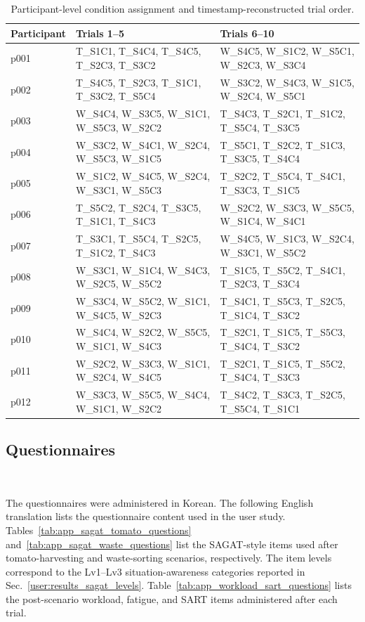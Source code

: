 \begin{table}[t]
\centering
\caption{Participant-level condition assignment and timestamp-reconstructed trial order.}
\label{tab:app_participant_condition_order}
\scriptsize
\setlength{\tabcolsep}{3pt}
\begin{tabular*}{\textwidth}{@{\extracolsep{\fill}}lll}
\toprule
\textbf{Participant} & \textbf{Trials 1--5} & \textbf{Trials 6--10} \\
\midrule
p001 & T\_S1C1, T\_S4C4, T\_S4C5, T\_S2C3, T\_S3C2 & W\_S4C5, W\_S1C2, W\_S5C1, W\_S2C3, W\_S3C4 \\
p002 & T\_S4C5, T\_S2C3, T\_S1C1, T\_S3C2, T\_S5C4 & W\_S3C2, W\_S4C3, W\_S1C5, W\_S2C4, W\_S5C1 \\
p003 & W\_S4C4, W\_S3C5, W\_S1C1, W\_S5C3, W\_S2C2 & T\_S4C3, T\_S2C1, T\_S1C2, T\_S5C4, T\_S3C5 \\
p004 & W\_S3C2, W\_S4C1, W\_S2C4, W\_S5C3, W\_S1C5 & T\_S5C1, T\_S2C2, T\_S1C3, T\_S3C5, T\_S4C4 \\
p005 & W\_S1C2, W\_S4C5, W\_S2C4, W\_S3C1, W\_S5C3 & T\_S2C2, T\_S5C4, T\_S4C1, T\_S3C3, T\_S1C5 \\
p006 & T\_S5C2, T\_S2C4, T\_S3C5, T\_S1C1, T\_S4C3 & W\_S2C2, W\_S3C3, W\_S5C5, W\_S1C4, W\_S4C1 \\
p007 & T\_S3C1, T\_S5C4, T\_S2C5, T\_S1C2, T\_S4C3 & W\_S4C5, W\_S1C3, W\_S2C4, W\_S3C1, W\_S5C2 \\
p008 & W\_S3C1, W\_S1C4, W\_S4C3, W\_S2C5, W\_S5C2 & T\_S1C5, T\_S5C2, T\_S4C1, T\_S2C3, T\_S3C4 \\
p009 & W\_S3C4, W\_S5C2, W\_S1C1, W\_S4C5, W\_S2C3 & T\_S4C1, T\_S5C3, T\_S2C5, T\_S1C4, T\_S3C2 \\
p010 & W\_S4C4, W\_S2C2, W\_S5C5, W\_S1C1, W\_S4C3 & T\_S2C1, T\_S1C5, T\_S5C3, T\_S4C4, T\_S3C2 \\
p011 & W\_S2C2, W\_S3C3, W\_S1C1, W\_S2C4, W\_S4C5 & T\_S2C1, T\_S1C5, T\_S5C2, T\_S4C4, T\_S3C3 \\
p012 & W\_S3C3, W\_S5C5, W\_S4C4, W\_S1C1, W\_S2C2 & T\_S4C2, T\_S3C3, T\_S2C5, T\_S5C4, T\_S1C1 \\
\bottomrule
\end{tabular*}
\end{table}

\subsection{Questionnaires}~\label{appx:user_questionnaires}

The questionnaires were administered in Korean. The following English translation lists the questionnaire content used in the user study.
Tables~\ref{tab:app_sagat_tomato_questions} and~\ref{tab:app_sagat_waste_questions} list the SAGAT-style items used after tomato-harvesting and waste-sorting scenarios, respectively. The item levels correspond to the Lv1--Lv3 situation-awareness categories reported in Sec.~\ref{user:results_sagat_levels}. Table~\ref{tab:app_workload_sart_questions} lists the post-scenario workload, fatigue, and SART items administered after each trial.

